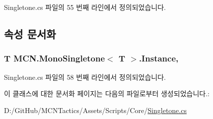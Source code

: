 Singletone.\+cs 파일의 55 번째 라인에서 정의되었습니다.



\subsection{속성 문서화}
\subsubsection[{\texorpdfstring{Instance}{Instance}}]{\setlength{\rightskip}{0pt plus 5cm}T {\bf M\+C\+N.\+Mono\+Singletone}$<$ T $>$.Instance\hspace{0.3cm}{\ttfamily [static]}, {\ttfamily [get]}}\hypertarget{class_m_c_n_1_1_mono_singletone_aa50c027cca64cf4ad30c1ee5c83e0b78}{}\label{class_m_c_n_1_1_mono_singletone_aa50c027cca64cf4ad30c1ee5c83e0b78}


Singletone.\+cs 파일의 58 번째 라인에서 정의되었습니다.



이 클래스에 대한 문서화 페이지는 다음의 파일로부터 생성되었습니다.\+:\begin{DoxyCompactItemize}
\item 
D\+:/\+Git\+Hub/\+M\+C\+N\+Tactics/\+Assets/\+Scripts/\+Core/\hyperlink{_singletone_8cs}{Singletone.\+cs}\end{DoxyCompactItemize}
